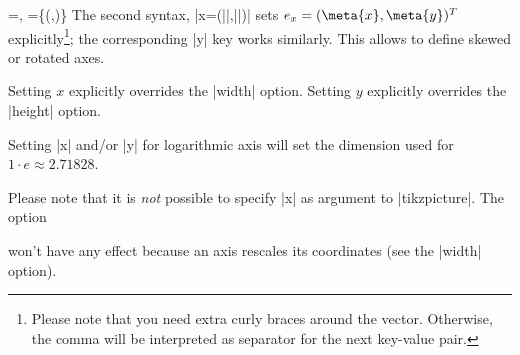 \begin{pgfplotsxykeylist}{
	\x=,
	\x={\{(,)\}}}
The second syntax, |x={(||,||)}| sets $e_x = (\meta{x},\meta{y})^T$ explicitly\footnote{Please note that you need extra curly braces around the vector. Otherwise, the comma will be interpreted as separator for the next key-value pair.}; the corresponding |y| key works similarly. This allows to define skewed or rotated axes.

\begin{codeexample}[]
\end{codeexample}

\begin{codeexample}[]
\end{codeexample}

	Setting $x$ explicitly overrides the |width| option. Setting $y$ explicitly overrides the |height| option.

	Setting |x| and/or |y| for logarithmic axis will set the dimension used for $1 \cdot e \approx 2.71828$.

	Please note that it is \emph{not} possible to specify |x| as argument to |tikzpicture|. The option 
\begin{codeexample}
\end{codeexample}
	won't have any effect because an axis rescales its coordinates (see the |width| option).

\begin{codeexample}[]
\end{codeexample}


\end{pgfplotsxykeylist}
